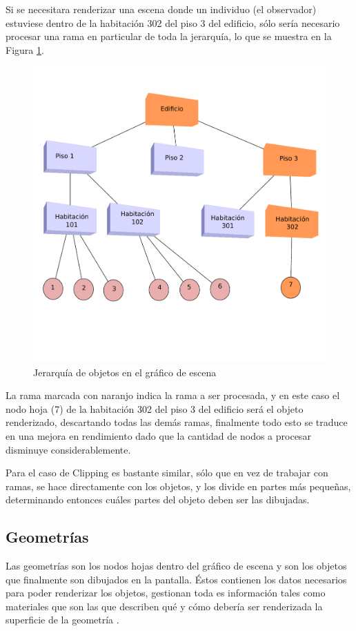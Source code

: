 \documentclass[a4paper,12pt,openany,oneside]{book}
\begin{document}
Si se necesitara renderizar una escena donde un individuo (el observador) estuviese dentro de la habitación 302 del piso 3 del edificio, sólo sería necesario procesar una rama en particular de toda la jerarquía, lo que se muestra en la Figura \ref{culling2label}.
\begin{figure}[!hbp]
\begin{center}
\includegraphics[scale=0.7]{culling2.pdf}
\caption[Ejemplo Culling 2]{Jerarquía de objetos en el gráfico de escena}\label{culling2label}
\end{center}
\end{figure}

La rama marcada con naranjo indica la rama a ser procesada, y en este caso el nodo hoja (7) de la habitación 302 del piso 3 del edificio será el objeto renderizado, descartando todas las demás ramas, finalmente todo esto se traduce en una mejora en rendimiento dado que la cantidad de nodos a procesar disminuye considerablemente. 

Para el caso de Clipping es bastante similar, sólo que en vez de trabajar con ramas, se hace directamente con los objetos, y los divide en partes más pequeñas, determinando entonces cuáles partes del objeto deben ser las dibujadas. 
\subsection{Geometrías}
Las geometrías son los nodos hojas dentro del gráfico de escena y son los objetos que finalmente son dibujados en la pantalla. Éstos contienen los datos necesarios para poder renderizar los objetos, gestionan toda es información tales como materiales que son las que describen qué y cómo debería ser renderizada la superficie de la geometría \cite{BEGINNERS}.
\end{document}

